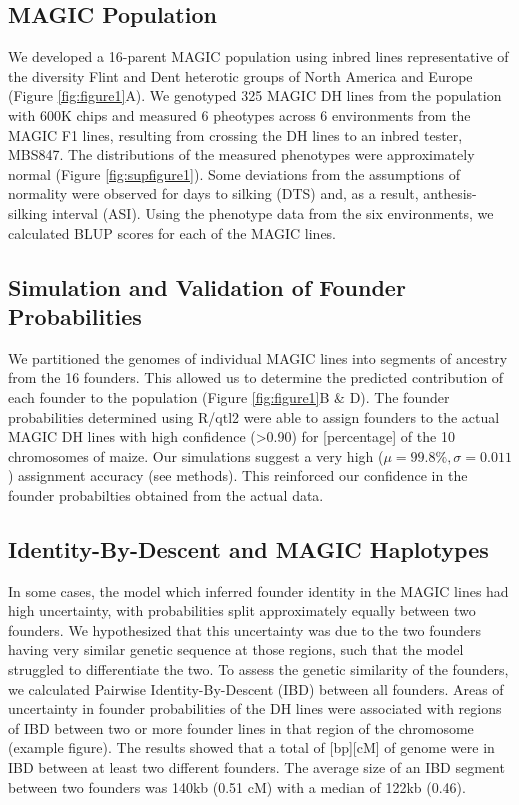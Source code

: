 \documentclass[article,9pt,twocolumn,twoside]{rilabRxiv}
\begin{document}
\subsection{MAGIC Population}

We developed a 16-parent MAGIC population using inbred lines representative of the diversity Flint and Dent heterotic groups of North America and Europe (Figure \ref{fig:figure1}A).
We genotyped 325 MAGIC DH lines from the population with 600K chips and measured 6 pheotypes across 6 environments from the MAGIC F1 lines, resulting from crossing the DH lines to an inbred tester, MBS847.
The distributions of the measured phenotypes were  approximately normal (Figure \ref{fig:supfigure1}).
Some deviations from the assumptions of normality were observed for days to silking (DTS) and, as a result, anthesis-silking interval (ASI).
Using the phenotype data from the six environments, we calculated BLUP scores for each of the MAGIC lines.

\subsection{Simulation and Validation of Founder Probabilities}

We partitioned the genomes of individual MAGIC lines into segments of ancestry from the 16 founders.
This allowed us to determine the predicted contribution of each founder to the population (Figure \ref{fig:figure1}B \& D).
The founder probabilities determined using R/qtl2 were able to assign founders to the actual MAGIC DH lines with high confidence (>0.90) for [percentage] of the 10 chromosomes of maize.
Our simulations suggest a very high ($\mu = 99.8\%, \sigma =0.011$) assignment accuracy (see methods).
This reinforced our confidence in the founder probabilties obtained from the actual data.

\subsection{Identity-By-Descent and MAGIC Haplotypes}
In some cases, the model which inferred founder identity in the MAGIC lines had high uncertainty, with probabilities split approximately equally between two founders.
We hypothesized that this uncertainty was due to the two founders having very similar genetic sequence at those regions, such that the model struggled to differentiate the two.
To assess the genetic similarity of the founders, we calculated Pairwise Identity-By-Descent (IBD) between all founders.
Areas of uncertainty in founder probabilities of the DH lines were associated with regions of IBD between two or more founder lines in that region of the chromosome (example figure).
The results showed that a total of [bp][cM] of genome were in IBD between at least two different founders.
The average size of an IBD segment between two founders was 140kb (0.51 cM) with a median of 122kb (0.46).
\end{document}
